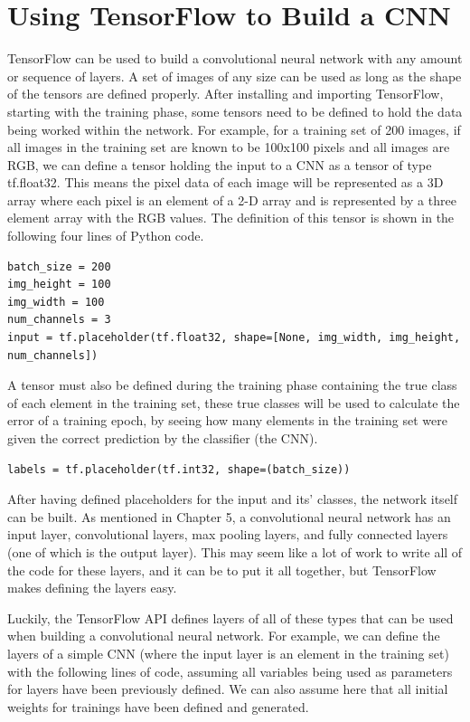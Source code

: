 \documentclass[12pt]{report} %
\begin{document}
\section{Using TensorFlow to Build a CNN}
	TensorFlow can be used to build a convolutional neural network with any amount or sequence of layers. A set of images of any size can be used as long as the shape of the tensors are defined properly. After installing and importing TensorFlow, starting with the training phase, some tensors need to be defined to hold the data being worked within the network. For example, for a training set of 200 images, if all images in the training set are known to be 100x100 pixels and all images are RGB, we can define a tensor holding the input to a CNN as a tensor of type tf.float32. This means the pixel data of each image will be represented as a 3D array where each pixel is an element of a 2-D array and is represented by a three element array with the RGB values. The definition of this tensor is shown in the following four lines of Python code.
\begin{verbatim}
batch_size = 200
img_height = 100
img_width = 100
num_channels = 3
input = tf.placeholder(tf.float32, shape=[None, img_width, img_height, num_channels])
\end{verbatim}

	A tensor must also be defined during the training phase containing the true class of each element in the training set, these true classes will be used to calculate the error of a training epoch, by seeing how many elements in the training set were given the correct prediction by the classifier (the CNN).
\begin{verbatim}
labels = tf.placeholder(tf.int32, shape=(batch_size))
\end{verbatim}
	
	After having defined placeholders for the input and its' classes, the network itself can be built. As mentioned in Chapter 5, a convolutional neural network has an input layer, convolutional layers, max pooling layers, and fully connected layers (one of which is the output layer). This may seem like a lot of work to write all of the code for these layers, and it can be to put it all together, but TensorFlow makes defining the layers easy. 
	
	Luckily, the TensorFlow API defines layers of all of these types that can be used when building a convolutional neural network. For example, we can define the layers of a simple CNN (where the input layer is an element in the training set) with the following lines of code, assuming all variables being used as parameters for layers have been previously defined. We can also assume here that all initial weights for trainings have been defined and generated.
	
\end{document}
